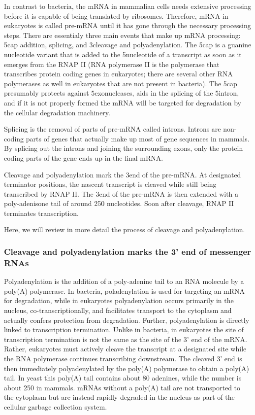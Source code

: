 In contrast to bacteria, the mRNA in mammalian cells needs extensive processing
before it is capable of being translated by ribosomes. Therefore, mRNA in
eukaryotes is called pre-mRNA until it has gone through the necessary
processing steps. There are essentialy three main events that make up mRNA
processing: 5\p cap addition, splicing, and 3\p cleavage and polyadenylation.
The 5\p cap is a guanine nucleotide variant that is added to the 5\p nucleotide
of a transcript as soon as it emerges from the RNAP II (RNA polymerase II is
the polymerase that transcribes protein coding genes in eukaryotes; there are
several other RNA polymerases as well in eukaryotes that are not present in
bacteria). The 5\p cap presumably protects against 5\p exonucleases, aids in
the splicing of the 5\p intron, and if it is not properly formed the mRNA will
be targeted for degradation by the cellular degradation machinery.

Splicing is the removal of parts of pre-mRNA called introns. Introns are
non-coding parts of genes that actually make up most of gene sequences in
mammals. By splicing out the introns and joining the surrounding exons, only
the protein coding parts of the gene ends up in the final mRNA.

Cleavage and polyadenylation mark the 3\p end of the pre-mRNA. At designated
terminator positions, the nascent transcript is cleaved while still being
transcribed by RNAP II. The 3\p end of the pre-mRNA is then extended with a
poly-adenisone tail of around 250 nucleotides. Soon after cleavage, RNAP II
terminates transcription.

Here, we will review in more detail the process of cleavage and
polyadenylation.

\subsubsection{Cleavage and polyadenylation marks the 3' end of messenger RNAs}
Polyadenylation is the addition of a poly-adenine tail to an RNA molecule by a
poly(A) polymerase. In bacteria, poladenylation is used for targeting an mRNA
for degradation, while in eukaryotes polyadenylation occurs primarily in the
nucleus, co-transcriptionally, and facilitates transport to the cytoplasm and
actually confers protection from degradation. Further, polyadenylation is
directly linked to transcription termination. Unlike in bacteria, in eukaryotes
the site of transcription termination is not the same as the site of the 3' end
of the mRNA. Rather, eukaryotes must actively cleave the transcript at a
designated site while the RNA polymerase continues transcribing downstream. The
cleaved 3' end is then immediately polyadenylated by the poly(A) polymerase to
obtain a poly(A) tail.  In yeast this poly(A) tail contains about 80 adenines,
while the number is about 250 in mammals. mRNAs without a poly(A) tail are not
transported to the cytoplasm but are instead rapidly degraded in the nucleus as
part of the cellular garbage collection system.

